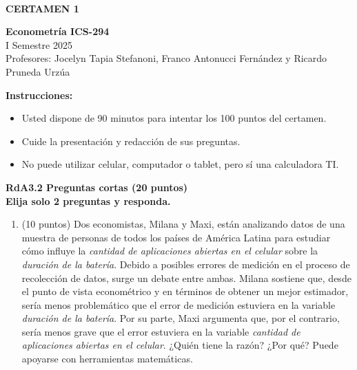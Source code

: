 \documentclass{article} %
\begin{document}
{\fontsize{30pt}{36pt}\selectfont

\begin{center}
\
\textbf{\\CERTAMEN 1}
\\
\end{center}

\begin{center}

\textbf{Econometría ICS-294}
\\
\vspace{0.2cm}
I Semestre 2025\\
Profesores: Jocelyn Tapia Stefanoni, Franco Antonucci Fernández y Ricardo Pruneda Urz\'ua\\
\end{center}

\textbf{Instrucciones:} 

\begin{itemize}

    \item Usted dispone de 90 minutos  para intentar los 100 puntos del certamen.
    \item Cuide la presentación y redacción de sus preguntas.
    \item No puede utilizar celular, computador o tablet, pero sí una calculadora TI.
     
\end{itemize}

{\bf RdA3.2  Preguntas cortas (20 puntos)}\\

{\bf Elija solo 2 preguntas y responda. }
\begin{enumerate}
    \item (10 puntos) Dos economistas, Milana y Maxi, están analizando datos de una muestra de personas de todos los países de América Latina para estudiar cómo influye la \textit{cantidad de aplicaciones abiertas en el celular} sobre la \textit{duración de la batería}. 
    Debido a posibles errores de medición en el proceso de recolección de datos, surge un debate entre ambas. Milana sostiene que, desde el punto de vista econométrico y en términos de obtener un mejor estimador, sería menos problemático que el error de medición estuviera en la variable \textit{duración de la batería}. Por su parte, Maxi argumenta que, por el contrario, sería menos grave que el error estuviera en la variable \textit{cantidad de aplicaciones abiertas en el celular}. ¿Quién tiene la razón? ¿Por qué? Puede apoyarse con herramientas matemáticas.


\end{enumerate}}
\end{document}
